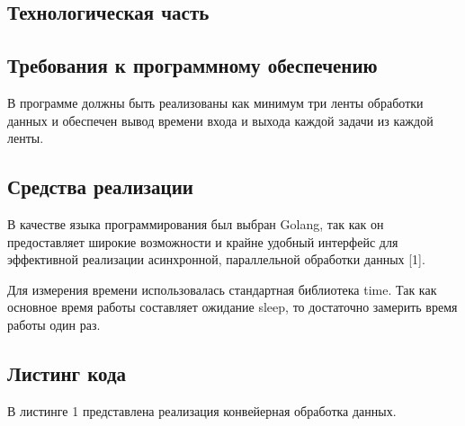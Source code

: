 \documentclass[a4paper,12pt]{article}
\begin{document}
    \newpage
    \afterpage{\FloatBarrier}
    
    \begin{center}
     	\section{Технологическая часть}
    	\subsection{Требования к программному обеспечению}
    \end{center}
    
    	В программе должны быть реализованы как минимум три ленты обработки данных и обеспечен вывод времени входа и выхода каждой задачи из каждой ленты.
    	
    \begin{center}
    \end{center}
    \begin{center}
        \subsection{Средства реализации}    
    \end{center}
    
		В качестве языка программирования был выбран Golang, так как он предоставляет широкие возможности и крайне удобный интерфейс для эффективной реализации асинхронной, параллельной обработки данных [1].
		
		Для измерения времени использовалась стандартная библиотека time. Так как основное время работы составляет ожидание sleep, то достаточно замерить время работы один раз.

		\newpage
    \begin{center}
        \subsection{Листинг кода}    
    \end{center}		
    
    	В листинге 1 представлена реализация конвейерная обработка данных.		
        	
\end{document}
